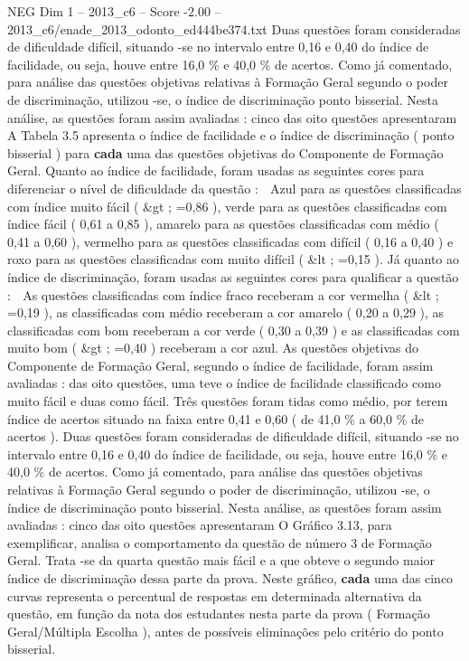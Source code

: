\begin{textsample}{NEG Dim 1 – 2013\_c6 – Score -2.00 – 2013\_c6/enade\_2013\_odonto\_ed444be374.txt}
Duas questões foram consideradas de dificuldade difícil, situando -se no intervalo entre 0,16 e 0,40 do índice de facilidade, ou seja, houve entre 16,0 \% e 40,0 \% de acertos.
Como já comentado, para análise das questões objetivas relativas à Formação Geral segundo o poder de discriminação, utilizou -se, o índice de discriminação ponto bisserial.
Nesta análise, as questões foram assim avaliadas : cinco das oito questões apresentaram A Tabela 3.5 apresenta o índice de facilidade e o índice de discriminação ( ponto bisserial ) para \textbf{cada} uma das questões objetivas do Componente de Formação Geral.
Quanto ao índice de facilidade, foram usadas as seguintes cores para diferenciar o nível de dificuldade da questão :  Azul para as questões classificadas com índice muito fácil ( \&gt ; =0,86 ), verde para as questões classificadas com índice fácil ( 0,61 a 0,85 ), amarelo para as questões classificadas com médio ( 0,41 a 0,60 ), vermelho para as questões classificadas com difícil ( 0,16 a 0,40 ) e roxo para as questões classificadas com muito difícil ( \&lt ; =0,15 ).
Já quanto ao índice de discriminação, foram usadas as seguintes cores para qualificar a questão :  As questões classificadas com índice fraco receberam a cor vermelha ( \&lt ; =0,19 ), as classificadas com médio receberam a cor amarelo ( 0,20 a 0,29 ), as classificadas com bom receberam a cor verde ( 0,30 a 0,39 ) e as classificadas com muito bom ( \&gt ; =0,40 ) receberam a cor azul.
As questões objetivas do Componente de Formação Geral, segundo o índice de facilidade, foram assim avaliadas : das oito questões, uma teve o índice de facilidade classificado como muito fácil e duas como fácil.
Três questões foram tidas como médio, por terem índice de acertos situado na faixa entre 0,41 e 0,60 ( de 41,0 \% a 60,0 \% de acertos ).
Duas questões foram consideradas de dificuldade difícil, situando -se no intervalo entre 0,16 e 0,40 do índice de facilidade, ou seja, houve entre 16,0 \% e 40,0 \% de acertos.
Como já comentado, para análise das questões objetivas relativas à Formação Geral segundo o poder de discriminação, utilizou -se, o índice de discriminação ponto bisserial.
Nesta análise, as questões foram assim avaliadas : cinco das oito questões apresentaram O Gráfico 3.13, para exemplificar, analisa o comportamento da questão de número 3 de Formação Geral.
Trata -se da quarta questão mais fácil e a que obteve o segundo maior índice de discriminação dessa parte da prova.
Neste gráfico, \textbf{cada} uma das cinco curvas representa o percentual de respostas em determinada alternativa da questão, em função da nota dos estudantes nesta parte da prova ( Formação Geral/Múltipla Escolha ), antes de possíveis eliminações pelo critério do ponto bisserial.

\end{textsample}
